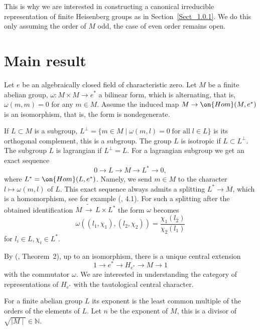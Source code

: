 \documentclass[11pt]{amsart}
\theoremstyle{definition}
\theoremstyle{remark}
\newcommand{\NN}{{\mathbb N}}
\newcommand{\Hom}{\on{Hom}}
\newcommand{\iso}{{\widetilde\to}}
\newcommand{\<}{\langle}
\renewcommand{\>}{\rangle}
\begin{document}
 This is why we are interested in constructing a canonical irreducible representation of finite Heisenberg groups as in Section~\ref{Sect_1.0.1}. We do this only assuming the order of $M$  odd, the case of even order remains open. 

\section{Main result}

\sssec{} Let $e$ be  an algebraically closed field of characteristic zero. 
Let $M$ be a finite abelian group, $\omega: M\times M\to e^*$ a bilinear form, which is alternating, that is, $\omega(m,m)=0$ for any $m\in M$. Assume the induced map $M\to \Hom(M, e^*)$ is an isomorphism, that is, the form is nondegenerate. 
 
 If $L\subset M$ is a subgroup, $L^{\perp}=\{m\in M\mid \omega(m, l)=0\; \mbox{for all}\; l\in L\}$ is its orthogonal complement, this is a subgroup. The group $L$ is isotropic if $L\subset L^{\perp}$. The subgroup $L$ is lagrangian if $L^{\perp}=L$. For a lagrangian subgroup we get an exact sequence 
\begin{equation}
\label{seq_1} 
0\to L\to M\to L^*\to 0,
\end{equation}
where $L^*=\Hom(L, e^*)$. Namely, we send $m\in M$ to the character $l\mapsto \omega(m, l)$ of $L$. This exact sequence always admits a splitting $L^*\to M$, which is a homomorphism, see for example  (\cite{P}, 4.1). For such a splitting after the obtained identification $M\,\iso\, L\times L^*$ the form $\omega$ becomes 
\begin{equation}
\label{eq_1}
\omega((l_1, \chi_1), (l_2,\chi_2))=\frac{\chi_1(l_2)}{\chi_2(l_1)}
\end{equation}
for $l_i\in L, \chi_i\in L^*$. 

 
 By (\cite{P}, Theorem~2), up to an isomorphism, there is a unique central extension 
\begin{equation}
\label{ext_H_e^*}
1\to e^*\to H_{e^*}\to M\to 1
\end{equation}
with the commutator $\omega$. We are interested in understanding the category of representations of $H_{e^*}$ with the tautological central character.

\sssec{} 
\label{Sect_2.0.2} For a finite abelian group $L$ its exponent is the least common multiple of the orders of the elements of $L$. Let $n$ be the exponent of $M$, this is a divisor of $\sqrt{\mid M\mid}\in\NN$. 
 
\end{document}
